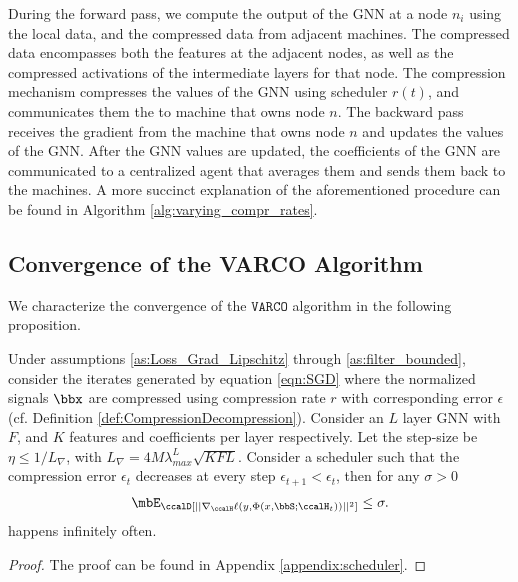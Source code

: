 \documentclass[lettersize,journal]{IEEEtran}
\newcommand{\algo}{\texttt{VARCO}}
\newcommand{\lipGrad}{L_\nabla}
\begin{document}
%
During the forward pass, we compute the output of the GNN at a node $n_i$ using the local data, and the compressed data from adjacent machines. The compressed data encompasses both the features at the adjacent nodes, as well as the compressed activations of the intermediate layers for that node. The compression mechanism compresses the values of the GNN using scheduler $r(t)$, and communicates them the to machine that owns node $n$. The backward pass receives the gradient from the machine that owns node $n$ and updates the values of the GNN. After the GNN values are updated, the coefficients of the GNN are communicated to a centralized agent that averages them and sends them back to the machines. A more succinct explanation of the aforementioned procedure can be found in Algorithm \ref{alg:varying_compr_rates}.

\subsection{Convergence of the VARCO Algorithm}
%
We characterize the convergence of the $\algo$ algorithm in the following proposition.


\begin{proposition}\label{prop:scheduler}
	Under assumptions \ref{as:Loss_Grad_Lipschitz} through \ref{as:filter_bounded}, consider the iterates generated by equation \eqref{eqn:SGD} where the normalized signals $\bbx$ are compressed using compression rate $r$ with corresponding error $\epsilon$(cf. Definition \ref{def:CompressionDecompression}). Consider an $L$ layer GNN with $F$, and $K$ features and coefficients per layer respectively. Let the step-size  be $\eta\leq 1/\lipGrad$, with $\lipGrad=4M\lambda_{max}^L\sqrt{KFL}$.
	Consider a scheduler such that the compression error $\epsilon_t$ decreases at every  step $\epsilon_{t+1}<\epsilon_t$, then for any $\sigma>0$
	\begin{align}
		\mbE_\ccalD[||\nabla_\ccalH \ell (y,\Phi(x,\bbS;\ccalH_t)) ||^2]\leq \sigma . 
	\end{align}
	happens infinitely often.
\end{proposition}
\begin{proof}
	The proof can be found in Appendix \ref{appendix:scheduler}.
\end{proof}
\end{document}
